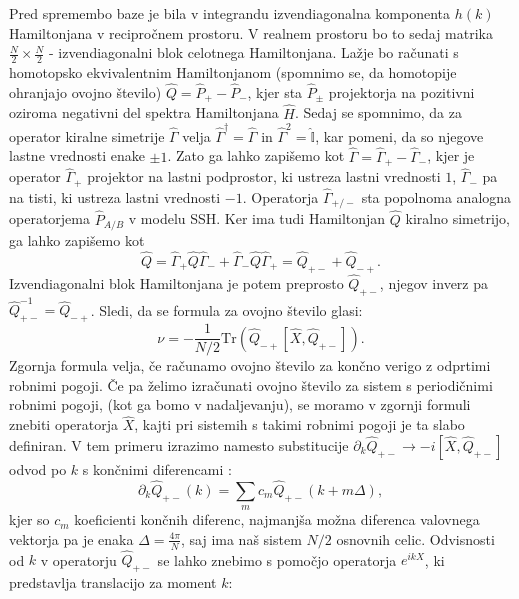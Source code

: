 Pred spremembo baze je bila v integrandu izvendiagonalna komponenta $h(k)$ Hamiltonjana v recipročnem prostoru. V realnem prostoru bo to sedaj matrika $\frac{N}{2} \times \frac{N}{2}$ - izvendiagonalni blok celotnega Hamiltonjana. Lažje bo računati s homotopsko ekvivalentnim Hamiltonjanom (spomnimo se, da homotopije ohranjajo ovojno število) $\hat{Q} = \hat{P}_+ -  \hat{P}_-$, kjer sta $\hat{P}_\pm$ projektorja na pozitivni oziroma negativni del spektra Hamiltonjana $\hat{H}$. Sedaj se spomnimo, da za operator kiralne simetrije $\hat{\Gamma}$ velja $\hat{\Gamma}^\dagger = \hat{\Gamma} $ in $\hat{\Gamma}^2 = \hat{\mathbb{I}}$, kar pomeni, da so njegove lastne vrednosti enake $\pm 1$. Zato ga lahko zapišemo kot $\hat{\Gamma} = \hat{\Gamma}_+ - \hat{\Gamma}_-$, kjer je operator $\hat{\Gamma}_+$ projektor na lastni podprostor, ki ustreza lastni vrednosti $1$, $\hat{\Gamma}_-$ pa na tisti, ki ustreza lastni vrednosti $-1$. Operatorja $\hat{\Gamma}_{+/-}$ sta popolnoma analogna operatorjema $\hat{P}_{A/B}$ v modelu SSH. Ker ima tudi Hamiltonjan $\hat{Q}$ kiralno simetrijo, ga lahko zapišemo kot
\begin{equation}
\hat{Q} = \hat{\Gamma}_+ \hat{Q} \hat{\Gamma}_- + \hat{\Gamma}_- \hat{Q} \hat{\Gamma}_+ = \hat{Q}_{+-} + \hat{Q}_{-+}.
\end{equation} 
Izvendiagonalni blok Hamiltonjana je potem preprosto $\hat{Q}_{+-}$, njegov inverz pa $\hat{Q}_{+-}^{-1} = \hat{Q}_{-+}$.
Sledi, da se formula za ovojno število glasi:
\begin{equation}
\nu = -\frac{1}{N/2} \mathrm{Tr} \left( \hat{Q}_{-+} [\hat{X},\hat{Q}_{+-}] \right).
\end{equation}
Zgornja formula velja, če računamo ovojno število za končno verigo z odprtimi robnimi pogoji. Če pa želimo izračunati ovojno število za sistem s periodičnimi robnimi pogoji, (kot ga bomo v nadaljevanju), se moramo v zgornji formuli znebiti operatorja $\hat{X}$, kajti  pri sistemih s takimi robnimi pogoji je ta slabo definiran.
V tem primeru izrazimo namesto substitucije $\partial_k \hat{Q}_{+-} \to -i [\hat{X}, \hat{Q}_{+-}]$ odvod po $k$ s končnimi diferencami \cite{diference}:
\begin{equation}
\partial_k \hat{Q}_{+-}(k) = \sum_m c_m \hat{Q}_{+-} (k+m \Delta ), 
\end{equation}
kjer so $c_m$ koeficienti končnih diferenc, najmanjša možna diferenca valovnega vektorja pa je enaka $\Delta  = \frac{4 \pi}{N}$, saj ima naš sistem $N/2$ osnovnih celic.
Odvisnosti od $k$ v operatorju $\hat{Q}_{+-}$ se lahko znebimo s pomočjo operatorja $e^{i k \hat{X}}$, ki predstavlja translacijo za moment $k$: 
